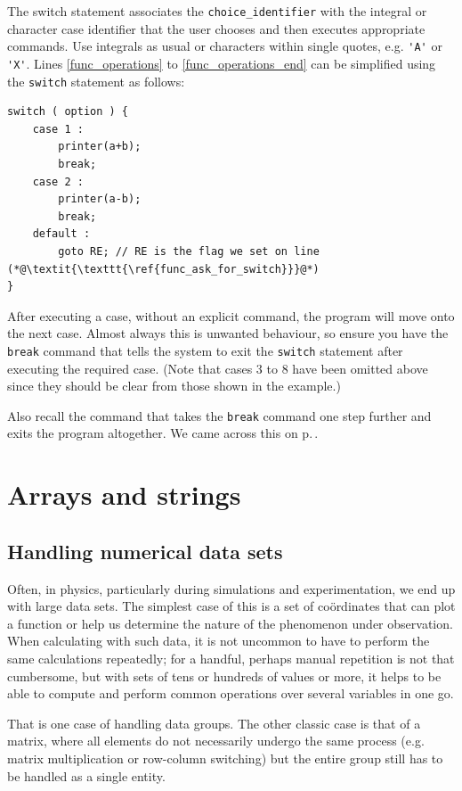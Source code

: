 \documentclass[11pt,oneside]{article}
\begin{document}
{{{{{{{{{The switch statement associates the \verb+choice_identifier+ with the integral or character case identifier that the user chooses and then executes appropriate commands. Use integrals as usual or characters within single quotes, e.g. \verb+'A'+ or \verb+'X'+. Lines \ref{func_operations} to \ref{func_operations_end} can be simplified using the \verb+switch+ statement as follows:

\begin{lstlisting}
switch ( option ) {
    case 1 : 
        printer(a+b);
        break;
    case 2 :
        printer(a-b);
        break;
    default :
        goto RE; // RE is the flag we set on line (*@\textit{\texttt{\ref{func_ask_for_switch}}}@*)
}
\end{lstlisting}

After executing a case, without an explicit  command, the program will move onto the next case. Almost always this is unwanted behaviour, so ensure you have the \verb+break+ command that tells the system to exit the \verb+switch+ statement after executing the required case. (Note that cases 3 to 8 have been omitted above since they should be clear from those shown in the example.)

Also recall the command  that takes the \verb+break+ command one step further and exits the program altogether. We came across this on p.\,\pageref{func_exit}.

\section{Arrays and strings}\label{sec:arrays-and-strings}

\subsection{Handling numerical data sets}

Often, in physics, particularly during simulations and experimentation, we end up with large data sets. The simplest case of this is a set of co\"{o}rdinates that can plot a function or help us determine the nature of the phenomenon under observation. When calculating with such data, it is not uncommon to have to perform the same calculations repeatedly; for a handful, perhaps manual repetition is not that cumbersome, but with sets of tens or hundreds of values or more, it helps to be able to compute and perform common operations over several variables in one go.

That is one case of handling data groups. The other classic case is that of a matrix, where all elements do not necessarily undergo the same process (e.g. matrix multiplication or row-column switching) but the entire group still has to be handled as a single entity.

}}}}}}}}}
\end{document}
